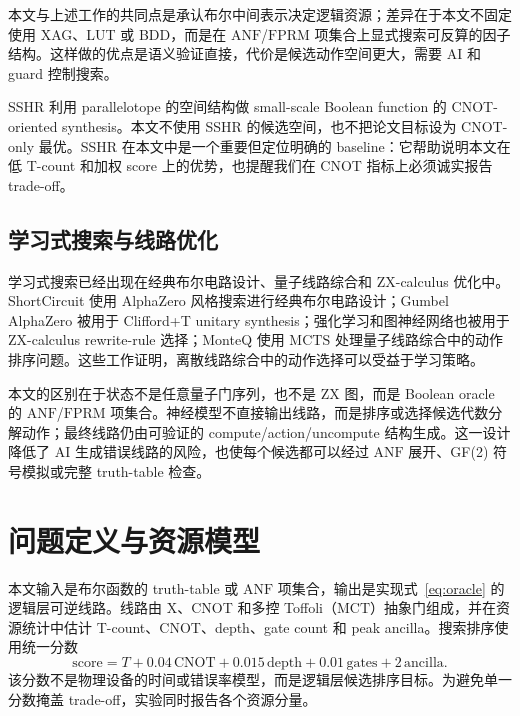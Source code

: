 \documentclass[UTF8,fontset=macnew,11pt]{ctexart}
\newcommand{\anf}{\ensuremath{\mathrm{ANF}}}
\newcommand{\fprm}{\ensuremath{\mathrm{FPRM}}}
\newcommand{\mcts}{\ensuremath{\mathrm{MCTS}}}
\newcommand{\score}{\ensuremath{\mathrm{score}}}
\newcommand{\ttable}{truth-table}
\newcommand{\mct}{\ensuremath{\mathrm{MCT}}}
\begin{document}
本文与上述工作的共同点是承认布尔中间表示决定逻辑资源；差异在于本文不固定使用 XAG、LUT 或 BDD，而是在 \anf{}/\fprm{} 项集合上显式搜索可反算的因子结构。这样做的优点是语义验证直接，代价是候选动作空间更大，需要 AI 和 guard 控制搜索。

SSHR 利用 parallelotope 的空间结构做 small-scale Boolean function 的 CNOT-oriented synthesis\cite{zheng2025sshr}。本文不使用 SSHR 的候选空间，也不把论文目标设为 CNOT-only 最优。SSHR 在本文中是一个重要但定位明确的 baseline：它帮助说明本文在低 T-count 和加权 score 上的优势，也提醒我们在 CNOT 指标上必须诚实报告 trade-off。

\subsection{学习式搜索与线路优化}

学习式搜索已经出现在经典布尔电路设计、量子线路综合和 ZX-calculus 优化中。ShortCircuit 使用 AlphaZero 风格搜索进行经典布尔电路设计\cite{tsaras2024shortcircuit}；Gumbel AlphaZero 被用于 Clifford+T unitary synthesis\cite{rietsch2024unitary}；强化学习和图神经网络也被用于 ZX-calculus rewrite-rule 选择\cite{riu2025rlzx}；MonteQ 使用 \mcts{} 处理量子线路综合中的动作排序问题\cite{machiya2026monteq}。这些工作证明，离散线路综合中的动作选择可以受益于学习策略。

本文的区别在于状态不是任意量子门序列，也不是 ZX 图，而是 Boolean oracle 的 \anf{}/\fprm{} 项集合。神经模型不直接输出线路，而是排序或选择候选代数分解动作；最终线路仍由可验证的 compute/action/uncompute 结构生成。这一设计降低了 AI 生成错误线路的风险，也使每个候选都可以经过 \anf{} 展开、GF(2) 符号模拟或完整 \ttable{} 检查。

\section{问题定义与资源模型}

本文输入是布尔函数的 \ttable{} 或 \anf{} 项集合，输出是实现式~\eqref{eq:oracle} 的逻辑层可逆线路。线路由 X、CNOT 和多控 Toffoli（\mct{}）抽象门组成，并在资源统计中估计 T-count、CNOT、depth、gate count 和 peak ancilla。搜索排序使用统一分数
\begin{equation}
  \score = T + 0.04\,\mathrm{CNOT} + 0.015\,\mathrm{depth}
         + 0.01\,\mathrm{gates} + 2\,\mathrm{ancilla}.
  \label{eq:score}
\end{equation}
该分数不是物理设备的时间或错误率模型，而是逻辑层候选排序目标。为避免单一分数掩盖 trade-off，实验同时报告各个资源分量。
\end{document}
